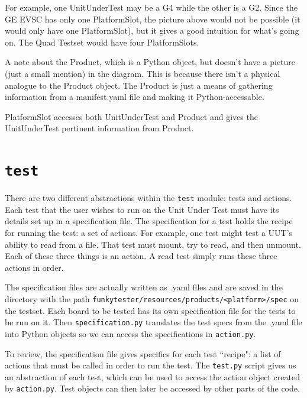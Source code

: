 \documentclass{report}
\begin{document}
For example, one UnitUnderTest may be a G4 while the other is a G2. Since the GE EVSC has only one PlatformSlot, the picture above would not be possible (it would only have one PlatformSlot), but it gives a good intuition for what's going on. The Quad Testset would have four PlatformSlots.

A note about the Product, which is a Python object, but doesn't have a picture (just a small mention) in the diagram. This is because there isn't a physical analogue to the Product object. The Product is just a means of gathering information from a manifest.yaml file and making it Python-accessable. %

PlatformSlot accesses both UnitUnderTest and Product and gives the UnitUnderTest pertinent information from Product.

\section{\texttt{test}}
There are two different abstractions within the \texttt{test} module: tests and actions. Each test that the user wishes to run on the Unit Under Test must have its details set up in a specification file. The specification for a test holds the recipe for running the test: a set of actions. For example, one test might test a UUT's ability to read from a file. That test must mount, try to read, and then unmount. Each of these three things is an action. A read test simply runs these three actions in order.

The specification files are actually written as .yaml files and are saved in the directory with the path \texttt{funkytester/resources/products/<platform>/spec} on the testset. Each board to be tested has its own specification file for the tests to be run on it. Then  \texttt{specification.py} translates the test specs from the .yaml file into Python objects so we can access the specifications in \texttt{action.py}.

To review, the specification file gives specifics for each test ``recipe": a list of actions that must be called in order to run the test. The \texttt{test.py} script gives us an abstraction of each test, which can be used to access the action object created by \texttt{action.py}. Test objects can then later be accessed by other parts of the code.\\
\end{document}
